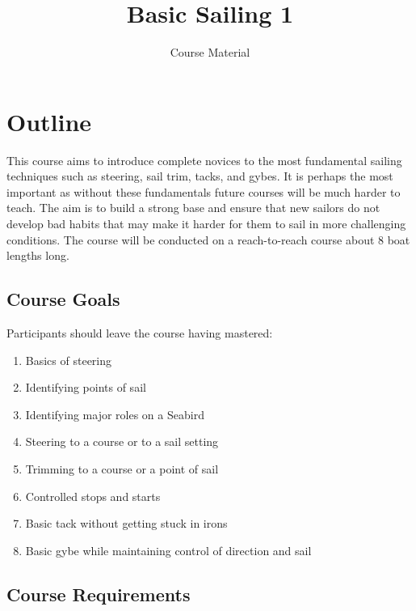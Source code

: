 \documentclass[12pt]{scrartcl}
\title{Basic Sailing 1}
\subtitle{Course Material}
\date{}
\begin{document}
\maketitle

\thispagestyle{empty}

\tableofcontents

\newpage

\section{Outline} \label{sec:outline}

This course aims to introduce complete novices to the most fundamental sailing techniques such as steering, sail trim, tacks, and gybes. It is perhaps the most important as without these fundamentals future courses will be much harder to teach. The aim is to build a strong base and ensure that new sailors do not develop bad habits that may make it harder for them to sail in more challenging conditions. The course will be conducted on a reach-to-reach course about 8 boat lengths long.

\subsection{Course Goals} \label{subsec:course goals}

Participants should leave the course having mastered:

\label{list:goals}
\begin{enumerate}
	\item Basics of steering
	\item Identifying points of sail
	\item Identifying major roles on a Seabird
	\item Steering to a course or to a sail setting
	\item Trimming to a course or a point of sail
	\item Controlled stops and starts
	\item Basic tack without getting stuck in irons
	\item Basic gybe while maintaining control of direction and sail
\end{enumerate}

\subsection{Course Requirements} \label{subsec:course requirements}
\end{document}
